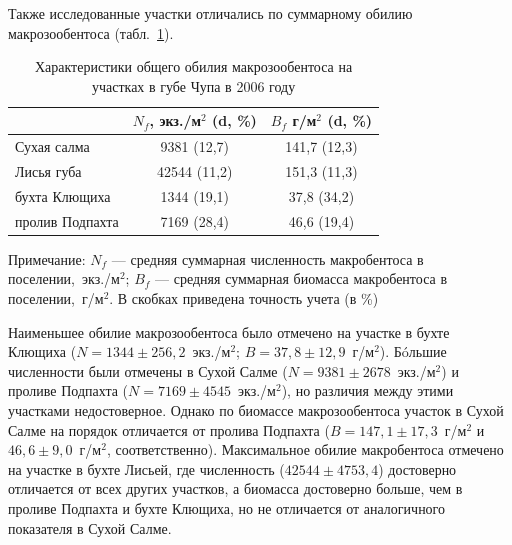 Также исследованные участки отличались по суммарному обилию макрозообентоса (табл.~\ref{tab:NB_fauna_spat}). 
	\begin{table}[p]
	\caption{Характеристики общего обилия макрозообентоса  на участках в губе Чупа в 2006 году}
	\label{tab:NB_fauna_spat}
	\begin{center}
		\begin{tabular}{|l|c|c|}
		\hline
		                & $N_f$, экз./м$^2$ (d, \%) & $B_f$ г/м$^2$ (d, \%)      \\ \hline 
		Сухая салма     & 9381 (12,7) & 141,7 (12,3) \\
		Лисья губа      & 42544 (11,2) & 151,3  (11,3) \\
		бухта Клющиха   & 1344 (19,1) & 37,8 (34,2) \\
		пролив Подпахта & 7169 (28,4) & 46,6 (19,4) \\ \hline
		\end{tabular}
	\end{center}

\footnotesize{Примечание: $N_f$ --- средняя суммарная численность макробентоса в поселении,~экз./м$^2$; $B_f$ --- средняя суммарная биомасса макробентоса в поселении,~г/м$^2$. В скобках приведена точность учета (в \%)}
	\end{table}
Наименьшее обилие макрозообентоса было отмечено на участке в бухте Клющиха ($N = 1344 \pm 256,2$~экз./м$^2$; $B = 37,8 \pm 12,9$~г/м$^2$). 
Б\'{o}льшие численности были отмечены в Сухой Салме ($N = 9381 \pm 2678$~экз./м$^2$) и проливе Подпахта ($N = 7169 \pm 4545$~экз./м$^2$), но различия между этими участками недостоверное. 
Однако по биомассе макрозообентоса участок в Сухой Салме на порядок отличается от пролива Подпахта ($B = 147,1 \pm 17,3$~г/м$^2$ и $46,6 \pm 9,0$~г/м$^2$, соответственно). 
Максимальное обилие макробентоса отмечено на участке в бухте Лисьей, где численность ($42544 \pm 4753,4$) достоверно отличается от всех других участков, а биомасса достоверно больше, чем в проливе Подпахта и бухте Клющиха, но не отличается от аналогичного показателя в Сухой Салме.

